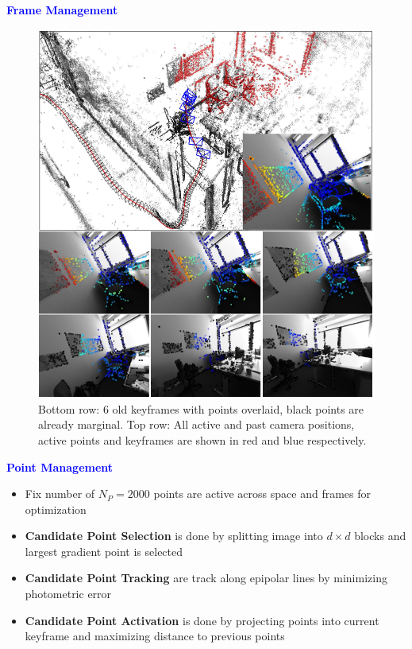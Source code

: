\documentclass[aspectratio=169]{beamer}
\begin{document}
\begin{frame}{\textcolor{blue}{\textbf{Frame Management}}}
	\vspace{-1cm}

	\begin{figure}
		\centering
		\includegraphics[height=0.6\textheight]{pics/keyframe_marginal_dso.png}
		\caption{
			Bottom row: 6 old keyframes with points overlaid, black points are already marginal.
			Top row: All active and past camera positions, active points and keyframes are shown in red and blue respectively.
		}
	\end{figure}

\end{frame}




\begin{frame}{\textcolor{blue}{\textbf{Point Management}}}
	\vspace{-0.5cm}
	\begin{itemize}
			\item Fix number of $N_P = 2000$ points are active across space and frames for optimization
			\item \textbf{Candidate Point Selection} is done by splitting image into $d \times d$ blocks and largest gradient point is selected 
			\item \textbf{Candidate Point Tracking} are track along epipolar lines by minimizing photometric error
			\item \textbf{Candidate Point Activation} is done by projecting points into current keyframe and maximizing distance to previous points
	\end{itemize}

\end{frame}
\end{document}
